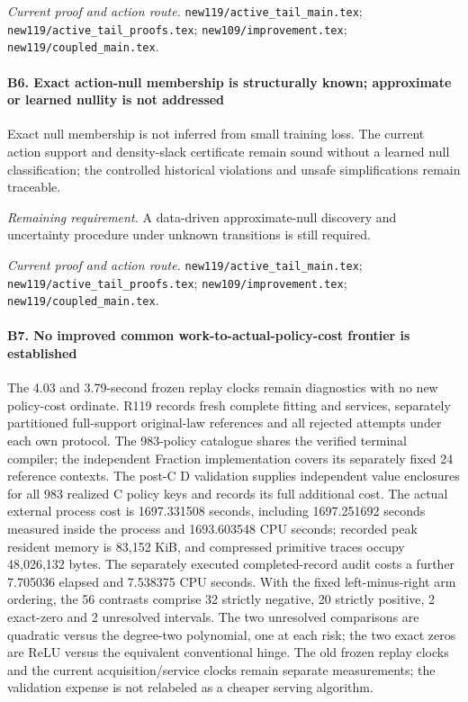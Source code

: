 \par\emph{Current proof and action route.} \nolinkurl{new119/active_tail_main.tex}; \nolinkurl{new119/active_tail_proofs.tex}; \nolinkurl{new109/improvement.tex}; \nolinkurl{new119/coupled_main.tex}.

\paragraph{B6. Exact action-null membership is structurally known; approximate or learned nullity is not addressed}

Exact null membership is not inferred from small training loss. The current action support and density-slack certificate remain sound without a learned null classification; the controlled historical violations and unsafe simplifications remain traceable.

\par\emph{Remaining requirement.} A data-driven approximate-null discovery and uncertainty procedure under unknown transitions is still required.

\par\emph{Current proof and action route.} \nolinkurl{new119/active_tail_main.tex}; \nolinkurl{new119/active_tail_proofs.tex}; \nolinkurl{new109/improvement.tex}; \nolinkurl{new119/coupled_main.tex}.

\paragraph{B7. No improved common work-to-actual-policy-cost frontier is established}

The 4.03 and 3.79-second frozen replay clocks remain diagnostics with no new policy-cost ordinate. R119 records fresh complete fitting and services, separately partitioned full-support original-law references and all rejected attempts under each own protocol. The 983-policy catalogue shares the verified terminal compiler; the independent Fraction implementation covers its separately fixed 24 reference contexts. The post-C D validation supplies independent value enclosures for all 983 realized C policy keys and records its full additional cost. The actual external process cost is 1697.331508 seconds, including 1697.251692 seconds measured inside the process and 1693.603548 CPU seconds; recorded peak resident memory is 83,152 KiB, and compressed primitive traces occupy 48,026,132 bytes. The separately executed completed-record audit costs a further 7.705036 elapsed and 7.538375 CPU seconds. With the fixed left-minus-right arm ordering, the 56 contrasts comprise 32 strictly negative, 20 strictly positive, 2 exact-zero and 2 unresolved intervals. The two unresolved comparisons are quadratic versus the degree-two polynomial, one at each risk; the two exact zeros are ReLU versus the equivalent conventional hinge. The old frozen replay clocks and the current acquisition/\allowbreak{}service clocks remain separate measurements; the validation expense is not relabeled as a cheaper serving algorithm.


